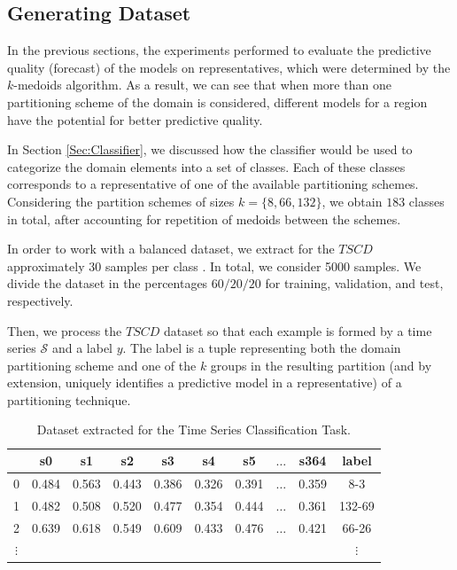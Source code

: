 \subsection{Generating Dataset}
\label{Sec:ClassifierDataset}

In the previous sections, the experiments performed to evaluate the predictive quality (forecast) of the models on representatives, which were determined by the $k$-medoids algorithm. As a result, we can see that when more than one partitioning scheme of the domain is considered, different models for a region have the potential for better predictive quality.


In Section \ref{Sec:Classifier}, we discussed how the classifier would be used to categorize the domain elements into a set of classes. Each of these classes corresponds to a representative of one of the available partitioning schemes. Considering the partition schemes of sizes $k=\{8, 66, 132\}$, we obtain $183$ classes in total, after accounting for repetition of medoids between the schemes.

In order to work with a balanced dataset, we extract for the $TSCD$ approximately $30$ samples per class \cite{Du2018}. In total, we consider 5000 samples. We divide the dataset in the percentages $60/20/20$ for training, validation, and test, respectively.

Then, we process the $TSCD$ dataset so that each example is formed by a time series $\mathcal{S}$ and a label $y$. The label is a tuple representing both the domain partitioning scheme and one of the $k$ groups in the resulting partition (and by extension, uniquely identifies a predictive model in a representative) of a partitioning technique.

\begin{table}[h]
	\centering
	\small
	\begin{tabular}[h]{|c|c|c|c|c|c|c|c|c|c|}
		\hline
		  & s0    & s1    & s2    & s3    & s4    &	s5    & $\ldots$ & s364  &   label \\ \hline
		0 & 0.484 & 0.563 & 0.443 & 0.386 & 0.326 &	0.391 & $\ldots$ & 0.359 &   8-3 \\
		1 &	0.482 &	0.508 &	0.520 &	0.477 &	0.354 &	0.444 & $\ldots$ & 0.361 & 132-69 \\
		2 &	0.639 & 0.618 &	0.549 &	0.609 &	0.433 & 0.476 & $\ldots$ & 0.421 &	66-26 \\ 
		$\vdots$  & &     &       &       &       &       &          &       & $\vdots$ \\ \hline
	\end{tabular}
	\caption{Dataset extracted for the Time Series Classification Task.}
	\label{Table:DatasetTSC}
\end{table}

